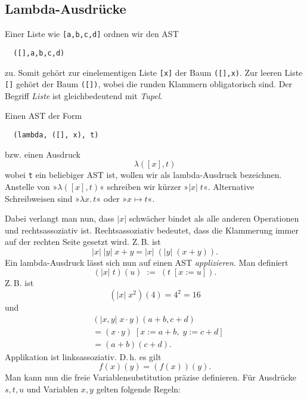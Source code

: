 \documentclass[a4paper,11pt,fleqn,twocolumn,twoside]{article}
\numberwithin{equation}{section}
\begin{document}
\subsection{Lambda-Ausdrücke}
Einer Liste wie \verb|[a,b,c,d]| ordnen wir den AST
\begin{verbatim}
  ([],a,b,c,d)
\end{verbatim}
zu. Somit gehört zur einelementigen Liste \verb|[x]| der Baum
\verb|([],x)|. Zur leeren Liste \verb|[]| gehört der Baum \verb|([])|,
wobei die runden Klammern obligatorisch sind.
Der Begriff \emph{Liste} ist gleichbedeutend mit \emph{Tupel}.

Einen AST der Form
\begin{verbatim}
  (lambda, ([], x), t)
\end{verbatim}
bzw. einen Ausdruck
\begin{equation}
\lambda([x],t)
\end{equation}
wobei \texttt{t} ein beliebiger AST ist,
wollen wir als lambda-Ausdruck bezeichnen. Anstelle von
»$\lambda([x],t)$« schreiben wir kürzer »$|x|\;t$«. Alternative
Schreibweisen sind »$\lambda x.\,t$« oder »$x\mapsto t$«.

Dabei verlangt man nun, dass $|x|$ schwächer bindet als alle anderen
Operationen und rechtsassoziativ ist. Rechtsassoziativ bedeutet, dass
die Klammerung immer auf der rechten Seite gesetzt wird. Z.\,B. ist
\begin{equation}
|x|\;|y|\; x+y = |x|\;(|y|\;(x+y)).
\end{equation}
Ein lambda-Ausdruck lässt sich nun auf einen AST \emph{applizieren}.
Man definiert
\begin{equation}
(|x|\; t)(u) \;:=\; (t\;[x:=u]).
\end{equation}
Z.\,B. ist
\begin{equation}
(|x|\;x^2)(4) = 4^2 = 16
\end{equation}
und
\begin{equation}
\begin{split}
& (|x,y|\;x\cdot y)(a+b,c+d)\\
&= (x\cdot y)\;[x:=a+b,\;y:=c+d]\\
&= (a+b)(c+d).
\end{split}
\end{equation}
Applikation ist linksassoziativ. D.\,h. es gilt
\begin{equation}
f(x)(y) = (f(x))(y).
\end{equation}
Man kann nun die freie Variablensubstitution präzise definieren.
Für Ausdrücke $s,t,u$ und Variablen $x,y$ gelten folgende Regeln:
\end{document}
